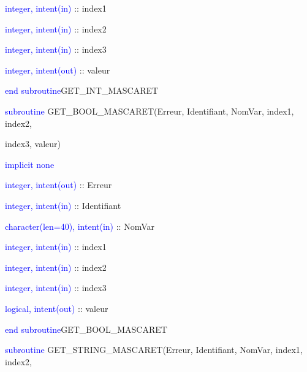\documentclass[a4paper,11pt]{article}
\begin{document}
        \hspace{1cm} \textcolor{blue}{integer, intent(in)}  :: index1
        
        \hspace{1cm} \textcolor{blue}{integer, intent(in)}  :: index2
        
        \hspace{1cm} \textcolor{blue}{integer, intent(in)}  :: index3
        
        \hspace{1cm} \textcolor{blue}{integer, intent(out)}  :: valeur
        
    \textcolor{blue}{end subroutine}GET\_INT\_MASCARET

 \vspace{0.5cm}
 
 
    \textcolor{blue}{subroutine} GET\_BOOL\_MASCARET(Erreur, Identifiant, NomVar, index1, index2,
    
     index3, valeur)
    
        \hspace{1cm}\textcolor{blue}{implicit none}                 
        
        \hspace{1cm} \textcolor{blue}{integer, intent(out)} :: Erreur
        
        \hspace{1cm} \textcolor{blue}{integer, intent(in)}  :: Identifiant
        
        \hspace{1cm} \textcolor{blue}{character(len=40), intent(in)}  :: NomVar
        
        \hspace{1cm} \textcolor{blue}{integer, intent(in)}  :: index1
        
        \hspace{1cm} \textcolor{blue}{integer, intent(in)}  :: index2
        
        \hspace{1cm} \textcolor{blue}{integer, intent(in)}  :: index3
        
        \hspace{1cm} \textcolor{blue}{logical, intent(out)}  :: valeur
        
    \textcolor{blue}{end subroutine}GET\_BOOL\_MASCARET

 \vspace{0.5cm}
 
    \textcolor{blue}{subroutine} GET\_STRING\_MASCARET(Erreur, Identifiant, NomVar, index1, index2,
    
\end{document}

